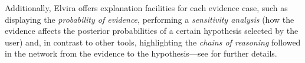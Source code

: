 Additionally, Elvira offers explanation facilities for each
evidence case, such as displaying the \emph{probability of
evidence}, performing a \emph{sensitivity analysis }(how the
evidence affects the posterior probabilities of a certain
hypothesis selected by the user) and, in contrast to other tools,
highlighting the \emph{chains of reasoning} followed in the
network from the evidence to the hypothesis---see \cite{lacave02b}
for further details.
